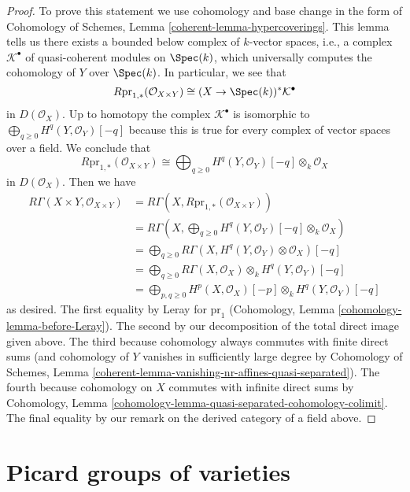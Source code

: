 \begin{proof}
\medskip\noindent
To prove this statement we use cohomology and base change in the form
of Cohomology of Schemes, Lemma \ref{coherent-lemma-hypercoverings}.
This lemma tells us there exists a bounded below complex of $k$-vector spaces,
i.e., a complex $\mathcal{K}^\bullet$ of quasi-coherent modules on $\Spec(k)$,
which universally computes the cohomology of $Y$ over $\Spec(k)$.
In particular, we see that
$$
R\text{pr}_{1, *}(\mathcal{O}_{X \times Y}) \cong
(X \to \Spec(k))^*\mathcal{K}^\bullet
$$
in $D(\mathcal{O}_X)$. Up to homotopy the complex $\mathcal{K}^\bullet$
is isomorphic to $\bigoplus_{q \geq 0} H^q(Y, \mathcal{O}_Y)[-q]$ because
this is true for every complex of vector spaces over a field.
We conclude that
$$
R\text{pr}_{1, *}(\mathcal{O}_{X \times Y}) \cong
\bigoplus\nolimits_{q \geq 0}
H^q(Y, \mathcal{O}_Y)[-q] \otimes_k \mathcal{O}_X
$$
in $D(\mathcal{O}_X)$. Then we have
\begin{align*}
R\Gamma(X \times Y, \mathcal{O}_{X \times Y})
& =
R\Gamma(X, R\text{pr}_{1, *}(\mathcal{O}_{X \times Y})) \\
& =
R\Gamma(X, \bigoplus\nolimits_{q \geq 0}
H^q(Y, \mathcal{O}_Y)[-q] \otimes_k \mathcal{O}_X) \\
& =
\bigoplus\nolimits_{q \geq 0}
R\Gamma(X,  H^q(Y, \mathcal{O}_Y) \otimes \mathcal{O}_X)[-q] \\
& =
\bigoplus\nolimits_{q \geq 0}
R\Gamma(X, \mathcal{O}_X) \otimes_k H^q(Y, \mathcal{O}_Y)[-q] \\
& =
\bigoplus\nolimits_{p, q \geq 0}
H^p(X, \mathcal{O}_X)[-p] \otimes_k H^q(Y, \mathcal{O}_Y)[-q]
\end{align*}
as desired. The first equality by Leray for $\text{pr}_1$
(Cohomology, Lemma \ref{cohomology-lemma-before-Leray}).
The second by our decomposition of the total direct image given above.
The third because cohomology always commutes with finite direct sums
(and cohomology of $Y$ vanishes in sufficiently large degree by
Cohomology of Schemes, Lemma
\ref{coherent-lemma-vanishing-nr-affines-quasi-separated}).
The fourth because cohomology on $X$ commutes with infinite
direct sums by Cohomology, Lemma
\ref{cohomology-lemma-quasi-separated-cohomology-colimit}.
The final equality by our remark on the derived category
of a field above.
\end{proof}








\section{Picard groups of varieties}
\label{section-picard-groups}

